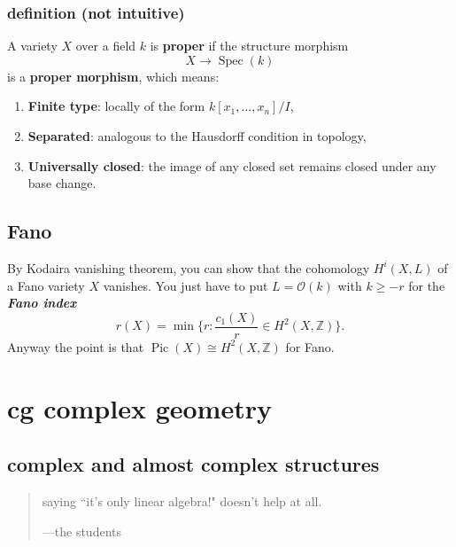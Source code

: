 \subsection*{definition (not intuitive)}
A variety \( X \) over a field \( k \) is \textbf{proper} if the structure morphism
\[
X \to \operatorname{Spec}(k)
\]
is a \textbf{proper morphism}, which means:
\begin{enumerate}
  \item \textbf{Finite type}: locally of the form \( k[x_1, \dots, x_n]/I \),
  \item \textbf{Separated}: analogous to the Hausdorff condition in topology,
  \item \textbf{Universally closed}: the image of any closed set remains closed under any base change.
\end{enumerate}

\section{Fano}

\begin{exercise}\leavevmode
By Kodaira vanishing theorem, you can show that the cohomology \(H^{i}(X,L)\) of a Fano variety \(X\) vanishes. You just have to put \(L=\mathcal{O}(k)\) with \(k\geq  -r\) for the \textit{\textbf{Fano index}} 
\[r(X)=\operatorname{min}\{r:\frac{c_1(X)}{r}\in H^{2}(X,\mathbb{Z})\}.\]
Anyway the point is that \(\operatorname{Pic}(X)\cong H^{2}(X,\mathbb{Z})\) for Fano.
\end{exercise}



\chapter{cg complex geometry}

\section{complex and almost complex structures}
\vspace{1em}
\begin{quotation}
saying ``it's only linear algebra!" doesn't help at all.

	\hfill ---the students
\end{quotation}
\vspace{2em}

